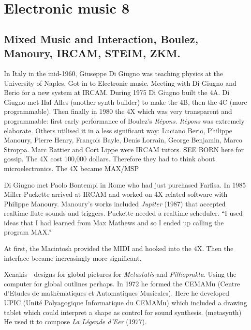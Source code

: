
\chapter{Electronic music 8}
\label{history8}

\section{Mixed Music and Interaction, Boulez, Manoury, IRCAM, STEIM, ZKM.}

In Italy in the mid-1960, Giuseppe Di Giugno was teaching physics at the University of Naples.  Got in to Electronic music.  Meeting with Di Giugno and Berio for a new system at IRCAM.  During 1975 Di Giugno built the 4A.  Di Giugno met Hal Alles (another synth builder) to make the 4B, then the 4C (more programmable).  Then finally in 1980 the 4X which was very transparent and programmable: first early performance of Boulez's \textit{R\'epons}.  \textit{R\'epons} was extremely elaborate.  Others utilised it in a less significant way: Luciano Berio, Philippe Manoury, Pierre Henry, François Bayle, Denis Lorrain, George Benjamin, Marco Stroppa.  Marc Battier and Cort Lippe were IRCAM tutors. SEE BORN here for gossip. The 4X cost 100,000 dollars.  Therefore they had to think about microelectronics. The 4X became MAX/MSP 

Di Giugno met Paolo Bontempi in Rome who had just purchased Farfisa.  In 1985 Miller Puckette arrived at IRCAM and worked on 4X related software with Philippe Manoury.  Manoury's works included \textit{Jupiter} (1987) that accepted realtime flute sounds and triggers. Puckette needed a realtime scheduler. ``I used ideas that I had learned from Max Mathews and so I ended up calling the program MAX.''

At first, the Macintosh provided the MIDI and hooked into the 4X.  Then the interface became increasingly more significant. 

Xenakis - designs for global pictures for \textit{Metastatis} and \textit{Pithoprakta}.  Using the computer for global outlines perhaps. In 1972 he formed the CEMAMu (Centre d'Etudes de math\`ematiques et Automatiques Musicales). Here he developed UPIC (Unit\'e Polyagogique Informatique du CEMAMu)  which included a drawing tablet which could interpret a shape as control for sound synthesis. (metasynth) He used it to compose \textit{La L\'egende d'Eer} (1977). 

